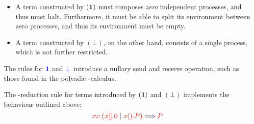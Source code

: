 \begin{itemize}
\item
  A term constructed by $(\mathbf{1})$ must composes \emph{zero} independent
  processes, and thus must halt. Furthermore, it must be able to split its
  environment between zero processes, and thus its environment must be empty.
\item
  A term constructed by $(\bot)$, on the other hand, consists of a single
  process, which is not further restricted.
\end{itemize}
The rules for $\textcolor{blue}{\mathbf{1}}$ and $\textcolor{blue}{\bot}$ introduce a nullary send and receive
operation, such as those found in the polyadic \textpi-calculus. 
\begin{center}
  \cpInfOne
  \cpInfBot
\end{center}
The \textbeta-reduction rule for terms introduced by $(\mathbf{1})$ and $(\bot)$
implements the behaviour outlined above:
\[
  \textcolor{red}{\nu x.(x[].0 \mid x().P)}
  \Longrightarrow
  \textcolor{red}{P}
\]


